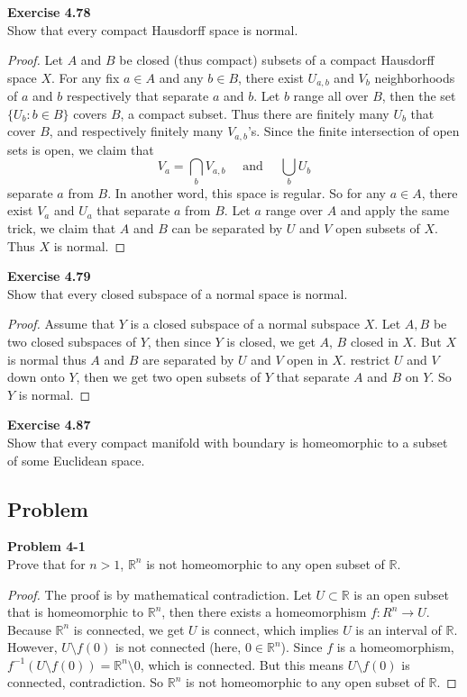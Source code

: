 \documentclass[12pt, a4paper]{article}
\theoremstyle{plain}
\newcommand{\R}{\mathbb{R}}
\newenvironment{exercise}[2][Exercise]
    { \begin{mdframed}[backgroundcolor=gray!20] \textbf{#1 #2} \\}
    {  \end{mdframed}}
\newenvironment{problem}[2][Problem]
    { \begin{mdframed}[backgroundcolor=gray!20] \textbf{#1 #2} \\}
    {  \end{mdframed}}
\begin{document}
\begin{exercise}{4.78}
    Show that every compact Hausdorff space is normal.
\end{exercise}
    \begin{proof}
        Let $A$ and $B$ be closed (thus compact) subsets of a compact Hausdorff space $X$. For any fix $a\in A$ and any $b\in B$, there exist $U_{a,b}$ and $V_b$ neighborhoods of $a$ and $b$ respectively that separate $a$ and $b$. Let $b$ range all over $B$, then the set $\{U_b:b\in B\}$ covers $B$, a compact subset. Thus there are finitely many $U_b$ that cover $B$, and respectively finitely many $V_{a,b}$'s. Since the finite intersection of open sets is open, we claim that
        \[
        V_a=\bigcap_b V_{a,b}\quad \text{ and }\quad \bigcup_{b}U_b
        \]
        separate $a$ from $B$. In another word, this space is regular. So for any $a\in A$, there exist $V_a$ and $U_a$ that separate $a$ from $B$. Let $a$ range over $A$ and apply the same trick, we claim that $A$ and $B$ can be separated by $U$ and $V$ open subsets of $X$. Thus $X$ is normal.
    \end{proof}

\begin{exercise}{4.79}
    Show that every closed subspace of a normal space is normal.
\end{exercise}
    \begin{proof}
        Assume that $Y$ is a closed subspace of a normal subspace $X$. Let $A,B$ be two closed subspaces of $Y$, then since $Y$ is closed, we get $A$, $B$ closed in $X$. But $X$ is normal thus $A$ and $B$ are separated by $U$ and $V$ open in $X$. restrict $U$ and $V$ down onto $Y$, then we get two open subsets of $Y$ that separate $A$ and $B$ on $Y$. So $Y$ is normal.
    \end{proof}

\begin{exercise}{4.87}
    Show that every compact manifold with boundary is homeomorphic to a subset of some Euclidean space.
\end{exercise}

    
\subsection{Problem}
\begin{problem}{4-1}
Prove that for $n>1$, $\R^n$ is not homeomorphic to any open subset of $\R$.
\end{problem}
	\begin{proof}
	The proof is by mathematical contradiction. Let $U\subset \R$ is an open subset that is homeomorphic to $\R^n$, then there exists a homeomorphism $f:R^n\rightarrow U$. Because $\R^n$ is connected, we get $U$ is connect, which implies $U$ is an interval of $\R$. However, $U\setminus f(0)$ is not connected (here, $0\in \R^n$). Since $f$ is a homeomorphism, $f^{-1}(U\setminus f(0))= \R^n\setminus 0$, which is connected. But this means $U\setminus f(0)$ is connected, contradiction. So $\R^n$ is not homeomorphic to any open subset of $\R$.
	\end{proof}
\end{document}
